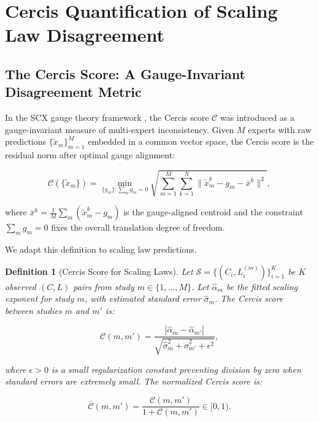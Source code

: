 \documentclass[12pt,a4paper]{article}
\newtheorem{definition}[theorem]{Definition}
\theoremstyle{remark}
\newcommand{\cercis}{\mathcal{C}}
\newcommand{\cercisnorm}{\bar{\mathcal{C}}}
\newcommand{\Loss}{L}
\begin{document}
\section{Cercis Quantification of Scaling Law Disagreement}
\label{sec:cercis}

\subsection{The Cercis Score: A Gauge-Invariant Disagreement Metric}

In the SCX gauge theory framework \cite{scx_gauge_formalized, scx_fiber_bundle}, the Cercis score $\cercis$ was introduced as a gauge-invariant measure of multi-expert inconsistency. Given $M$ experts with raw predictions $\{\tilde{x}_m\}_{m=1}^M$ embedded in a common vector space, the Cercis score is the residual norm after optimal gauge alignment:

\begin{equation}
\cercis(\{\tilde{x}_m\}) = \min_{\{g_m\}: \sum_m g_m = 0} \sqrt{\sum_{m=1}^M \sum_{k=1}^N \|\tilde{x}_m^k - g_m - \bar{x}^k\|^2},
\label{eq:cercis_def}
\end{equation}

where $\bar{x}^k = \frac{1}{M} \sum_m (\tilde{x}_m^k - g_m)$ is the gauge-aligned centroid and the constraint $\sum_m g_m = 0$ fixes the overall translation degree of freedom.

We adapt this definition to scaling law predictions.

\begin{definition}[Cercis Score for Scaling Laws]
\label{def:cercis_scaling}
Let $\mathcal{S} = \{(C_i, \Loss_i^{(m)})\}_{i=1}^{K}$ be $K$ observed $(C, \Loss)$ pairs from study $m \in \{1, \dots, M\}$. Let $\hat{\alpha}_m$ be the fitted scaling exponent for study $m$, with estimated standard error $\hat{\sigma}_m$. The Cercis score between studies $m$ and $m'$ is:

\begin{equation}
\cercis(m, m') = \frac{|\hat{\alpha}_m - \hat{\alpha}_{m'}|}{\sqrt{\hat{\sigma}_m^2 + \hat{\sigma}_{m'}^2 + \epsilon^2}},
\label{eq:cercis_scaling}
\end{equation}

where $\epsilon > 0$ is a small regularization constant preventing division by zero when standard errors are extremely small. The normalized Cercis score is:

\begin{equation}
\cercisnorm(m, m') = \frac{\cercis(m, m')}{1 + \cercis(m, m')} \in [0, 1).
\label{eq:cercis_norm}
\end{equation}
\end{definition}
\end{document}
